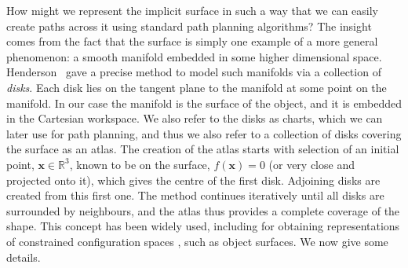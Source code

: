 How might we represent the implicit surface in such a way that we can easily create paths across it using standard path planning algorithms?  The insight comes from the fact that the surface is simply one example of a more general phenomenon: a smooth manifold embedded in some higher dimensional space. Henderson~\cite{Henderson1993COMPUTING} gave a precise method to model such manifolds via a collection of \emph{disks}. Each disk lies on the tangent plane to the manifold at some point on the manifold. 
In our case the manifold is the surface of the object, and it is embedded in the Cartesian workspace. We also refer to the disks as charts, which we can later use for path planning, and thus we also refer to a collection of disks covering the surface as an atlas. The creation of the atlas starts with selection of an initial point, $\mathbf{x} \in \mathbb{R}^3$, known to be on the surface, $f(\mathbf{x}) = 0$ (or very close and projected onto it), which gives the centre of the first disk. Adjoining disks are created from this first one. The method continues iteratively until all disks are surrounded by neighbours, and the atlas thus provides a complete coverage of the shape. This concept has been widely used, including for obtaining representations of constrained configuration spaces \cite{Porta2014CuikSuite}, such as object surfaces. We now give some details.


